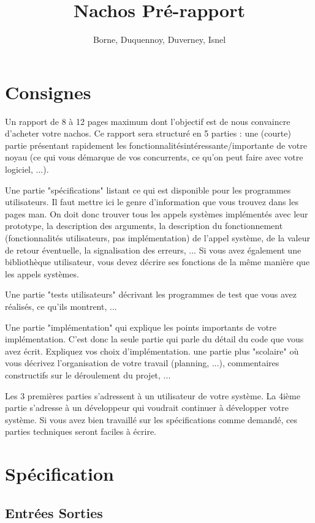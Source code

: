 \documentclass[11pt]{article}
\author{Borne, Duquennoy, Duverney, Isnel}
\date{}
\title{Nachos Pré-rapport}
\begin{document}
\maketitle
\section{Consignes}
Un rapport de 8 à 12 pages maximum dont l'objectif est de nous convaincre d'acheter votre nachos. Ce rapport sera structuré en 5 parties :
une (courte) partie présentant rapidement les fonctionnalitésintéressante/importante de votre noyau (ce qui vous démarque de vos concurrents, ce qu'on peut faire avec votre logiciel, ...).

Une partie "spécifications" listant ce qui est disponible pour les programmes utilisateurs.
Il faut mettre ici le genre d'information que vous trouvez dans les pages man.
On doit donc trouver tous les appels systèmes implémentés avec leur prototype, la description des arguments,
la description du fonctionnement (fonctionnalités utilisateurs, pas implémentation) de l'appel système,
de la valeur de retour éventuelle, la signalisation des erreurs, ...
Si vous avez également une bibliothèque utilisateur, vous devez décrire ses fonctions de la même manière que les appels systèmes.

Une partie "tests utilisateurs" décrivant les programmes de test que vous avez réalisés, ce qu'ils montrent, ...

Une partie "implémentation" qui explique les points importants de votre implémentation. C'est donc la seule partie qui parle du détail du code que vous avez écrit. Expliquez vos choix d'implémentation.
une partie plus "scolaire" où vous décrivez l'organisation de votre travail (planning, ...), commentaires constructifs sur le déroulement du projet, ...

Les 3 premières parties s'adressent à un utilisateur de votre système. La 4ième partie s'adresse à un développeur qui voudrait continuer à développer votre système. Si vous avez bien travaillé sur les spécifications comme demandé, ces parties techniques seront faciles à écrire.









\section{Spécification}
\subsection{Entrées Sorties}
\end{document}
